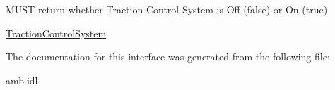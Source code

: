 M\-U\-S\-T return whether Traction Control System is Off (false) or On (true) 

\hyperlink{interfaceVehicle_1_1org_1_1automotive_1_1TractionControlSystem}{Traction\-Control\-System} 

The documentation for this interface was generated from the following file\-:\begin{DoxyCompactItemize}
\item 
amb.\-idl\end{DoxyCompactItemize}
